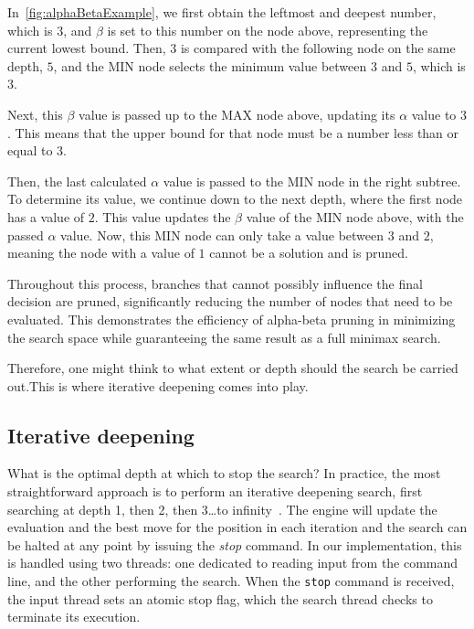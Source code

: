 \noindent In~\cref{fig:alphaBetaExample}, we first obtain the leftmost and deepest number, which is $3$, and $\beta$ is set to this number on the node above, representing the current lowest bound. Then, $3$ is compared with the following node on the same depth, $5$, and the MIN node selects the minimum value between $3$ and $5$, which is $3$.

\vspace{1em}

\noindent Next, this $\beta$ value is passed up to the MAX node above, updating its $\alpha$ value to $3$. This means that the upper bound for that node must be a number less than or equal to $3$.

\vspace{1em}

\noindent Then, the last calculated $\alpha$ value is passed to the MIN node in the right subtree. To determine its value, we continue down to the next depth, where the first node has a value of $2$. This value updates the $\beta$ value of the MIN node above, with the passed $\alpha$ value. Now, this MIN node can only take a value between $3$ and $2$, meaning the node with a value of $1$ cannot be a solution and is pruned.

\vspace{1em}

\noindent Throughout this process, branches that cannot possibly influence the final decision are pruned, significantly reducing the number of nodes that need to be evaluated. This demonstrates the efficiency of alpha-beta pruning in minimizing the search space while guaranteeing the same result as a full minimax search.

\vspace{1em}

\noindent Therefore, one might think to what extent or depth should the search be carried out.This is where iterative deepening comes into play.

\subsection{Iterative deepening}\label{sec:iterativeDeepening}

What is the optimal depth at which to stop the search? In practice, the most straightforward approach is to perform an iterative deepening search, first searching at depth 1, then 2, then 3\ldots to infinity~\cite{IterativeDeepening}. The engine will update the evaluation and the best move for the position in each iteration and the search can be halted at any point by issuing the \textit{stop} command. In our implementation, this is handled using two threads: one dedicated to reading input from the command line, and the other performing the search. When the \texttt{stop} command is received, the input thread sets an atomic stop flag, which the search thread checks to terminate its execution.

